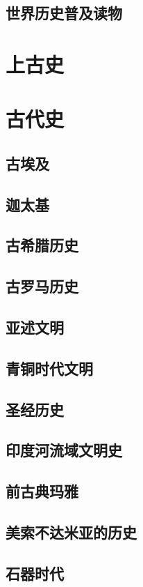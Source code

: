 \documentclass[UTF8]{../RepresentationUniverse}
\begin{document}
    \subsection{世界历史普及读物}

\section{上古史}
\section{古代史}
    \subsection{古埃及}
    \subsection{迦太基}
    \subsection{古希腊历史}
    \subsection{古罗马历史}
    \subsection{亚述文明}
    \subsection{青铜时代文明}
    \subsection{圣经历史}
    \subsection{印度河流域文明史}
    \subsection{前古典玛雅}
    \subsection{美索不达米亚的历史}
    \subsection{石器时代}
\end{document}
